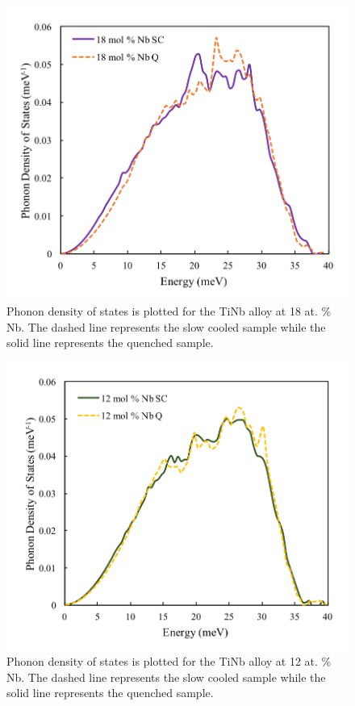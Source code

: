 \pagebreak
\begin{figure}[H]
	\centering
	\includegraphics[width=\textwidth]{Chapter-7/Figures/50dos18.png}
	\caption{Phonon density of states is plotted for the TiNb alloy at 18 at. \% Nb. The dashed line represents the slow cooled sample while the solid line represents the quenched sample.}
	\label{Ch7-figure:50dos18}
\end{figure}

\pagebreak
\begin{figure}[H]
	\centering
	\includegraphics[width=\textwidth]{Chapter-7/Figures/50dos12.png}
	\caption{Phonon density of states is plotted for the TiNb alloy at 12 at. \% Nb. The dashed line represents the slow cooled sample while the solid line represents the quenched sample.}
	\label{Ch7-figure:50dos12}
\end{figure}

